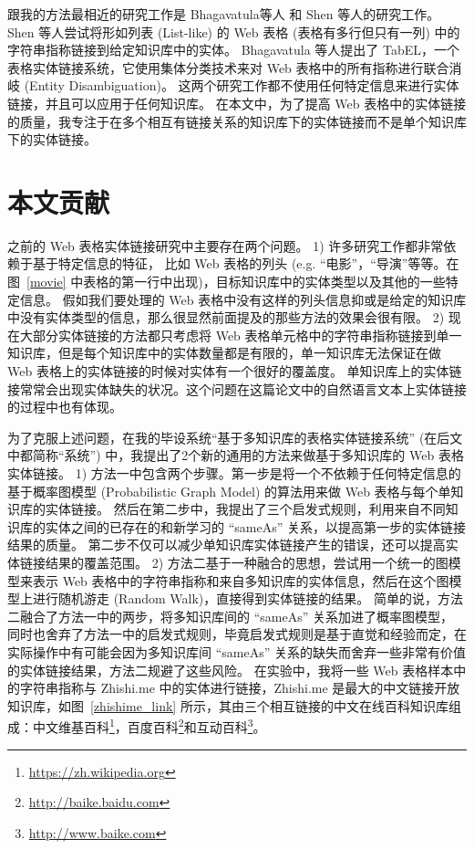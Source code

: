 跟我的方法最相近的研究工作是 Bhagavatula等人\cite{bhagavatula2015tabel} 和 Shen 等人\cite{shen2012liege}的研究工作。
Shen 等人\cite{shen2012liege}尝试将形如列表 (List-like) 的 Web 表格 (表格有多行但只有一列) 中的字符串指称链接到给定知识库中的实体。
Bhagavatula 等人\cite{bhagavatula2015tabel}提出了 TabEL，一个表格实体链接系统，它使用集体分类技术来对 Web 表格中的所有指称进行联合消岐 (Entity Disambiguation)。
这两个研究工作都不使用任何特定信息来进行实体链接，并且可以应用于任何知识库。
在本文中，为了提高 Web 表格中的实体链接的质量，我专注于在多个相互有链接关系的知识库下的实体链接而不是单个知识库下的实体链接。\par


\section{本文贡献}

之前的 Web 表格实体链接研究中主要存在两个问题。
1) 许多研究工作\cite{limaye2010annotating}\cite{hignette2009fuzzy}\cite{mulwad2013semantic}\cite{syed2010exploiting}\cite{zhang2014towards}\cite{zhang2014learning}都非常依赖于基于特定信息的特征，
比如 Web 表格的列头 (e.g. ``电影''，``导演''等等。在图~\ref{movie} 中表格的第一行中出现)，目标知识库中的实体类型以及其他的一些特定信息。
假如我们要处理的 Web 表格中没有这样的列头信息抑或是给定的知识库中没有实体类型的信息，那么很显然前面提及的那些方法的效果会很有限。
2) 现在大部分实体链接的方法\cite{limaye2010annotating}\cite{hignette2009fuzzy}\cite{syed2010exploiting}\cite{zhang2014towards}\cite{zhang2014learning}\cite{shen2012liege}\cite{bhagavatula2015tabel}都只考虑将 Web 表格单元格中的字符串指称链接到单一知识库，但是每个知识库中的实体数量都是有限的，单一知识库无法保证在做 Web 表格上的实体链接的时候对实体有一个很好的覆盖度。
单知识库上的实体链接常常会出现实体缺失的状况。这个问题在这篇论文\cite{pereira2014entity}中的自然语言文本上实体链接的过程中也有体现。\par

为了克服上述问题，在我的毕设系统``基于多知识库的表格实体链接系统'' (在后文中都简称``系统'') 中，我提出了2个新的通用的方法来做基于多知识库的 Web 表格实体链接。
1) 方法一中包含两个步骤。第一步是将一个不依赖于任何特定信息的基于概率图模型 (Probabilistic Graph Model) 的算法用来做 Web 表格与每个单知识库的实体链接。
然后在第二步中，我提出了三个启发式规则，利用来自不同知识库的实体之间的已存在的和新学习的 ``sameAs'' 关系，以提高第一步的实体链接结果的质量。
第二步不仅可以减少单知识库实体链接产生的错误，还可以提高实体链接结果的覆盖范围。
2) 方法二基于一种融合的思想，尝试用一个统一的图模型来表示 Web 表格中的字符串指称和来自多知识库的实体信息，然后在这个图模型上进行随机游走 (Random Walk)，直接得到实体链接的结果。
简单的说，方法二融合了方法一中的两步，将多知识库间的 ``sameAs'' 关系加进了概率图模型，
同时也舍弃了方法一中的启发式规则，毕竟启发式规则是基于直觉和经验而定，在实际操作中有可能会因为多知识库间 ``sameAs'' 关系的缺失而舍弃一些非常有价值的实体链接结果，方法二规避了这些风险。
在实验中，我将一些 Web 表格样本中的字符串指称与 Zhishi.me\cite{niu2011zhishi} 中的实体进行链接，Zhishi.me 是最大的中文链接开放知识库，如图~\ref{zhishime_link} 所示，其由三个相互链接的中文在线百科知识库组成：中文维基百科\footnote{\url{https://zh.wikipedia.org}}，百度百科\footnote{\url{http://baike.baidu.com}}和互动百科\footnote{\url{http://www.baike.com}}。


